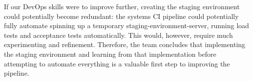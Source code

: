If our DevOps skills were to improve further, creating the staging environment could potentially become redundant: the systems CI pipeline could potentially fully automate spinning up a temporary staging-environment-server, running load tests and acceptance tests automatically. This would, however, require much experimenting and refinement. Therefore, the team concludes that implementing the staging environment and learning from that implementation before attempting to automate everything is a valuable first step to improving the pipeline.